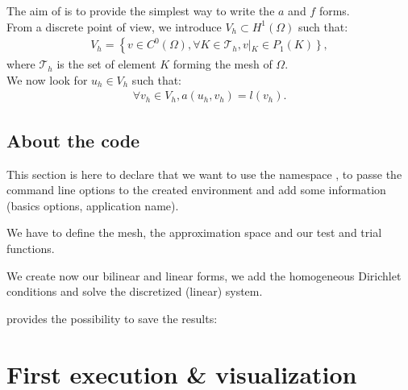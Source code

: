 The aim of \feel is to provide the simplest way to write the $a$ and $f$ forms.\\

From a discrete point of view, we introduce $V_h\subset H^1\left( \Omega \right)$ such that:
\begin{equation}\nonumber
  \begin{aligned}
V_h = \left\{ v \in C^0\left( \Omega \right), \forall K\in \mathcal{T}_h, \right.v\left|_K \in P_1\left( K \right) \right\},
    \end{aligned}
  \end{equation}
where $\mathcal{T}_h$ is the set of element $K$ forming the mesh of $\Omega$. \\
We now look for $u_h \in V_h$ such that:
\begin{equation}\nonumber
  \begin{aligned}
    \forall v_h\in V_h, a\left( u_h,v_h \right)=l\left( v_h \right).
    \end{aligned}
  \end{equation}

\subsection{About the code}
\label{sec:about-code}

This section is here to declare that we want to use the namespace \feel, to
passe the command line options to the created environment and add some
information (basics \feel options, application name).

We have to define the mesh, the approximation space and our test and trial
functions.

We create now our bilinear and linear forms, we add the homogeneous Dirichlet
conditions and solve the discretized (linear) system.

\feel provides the possibility to save the results:



\section{First execution \& visualization}
\label{sec:first-execution}


